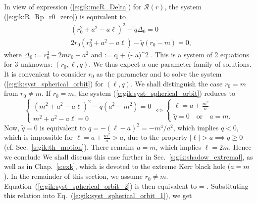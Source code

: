 In view of expression (\ref{e:gik:mcR_Delta}) for $\mathcal{R}(r)$, the system
(\ref{e:gik:R_Rp_r0_zero}) is equivalent to
\begin{subequations}
\label{e:gik:syst_spherical_orbit}
\begin{align}
    &(r_0^2 + a^2 - a \ell)^2 - \tilde{q} \Delta_0 = 0  \label{e:gik:syst_spherical_orbit_1} \\
    & 2 r_0 (r_0^2 + a^2 - a \ell) - \tilde{q} (r_0 - m) = 0 , \label{e:gik:syst_spherical_orbit_2}
\end{align}
\end{subequations}
where $\Delta_0 := r_0^2 - 2 m r_0 + a^2$ and
\be \label{e:gik:def_tq}
     := q + (\ell - a)^2 .
\ee
This is a system of 2 equations for 3 unknowns: $(r_0,\ell,q)$. We thus
expect a one-parameter family of solutions. It is convenient to consider
$r_0$ as the parameter and to solve the system (\ref{e:gik:syst_spherical_orbit})
for $(\ell,q)$.
We shall distinguish the case $r_0 = m$ from $r_0 \neq m$.
If $r_0 = m$, the system (\ref{e:gik:syst_spherical_orbit}) reduces to
\[
\left\{\begin{array}{l}
    (m^2 + a^2 - a \ell)^2 - \tilde{q} (a^2 - m^2) = 0 \\
    m^2 + a^2 - a \ell = 0
\end{array}
\right.
\iff
\left\{\begin{array}{l}
    \ell = a + \frac{m^2}{a}\\
    \tilde{q} = 0 \quad\mbox{or}\quad a = m .
\end{array}
\right.
\]
Now, $\tilde{q} = 0$ is equivalent to $q = - (\ell - a)^2 = - m^4 / a^2$,
which implies $q< 0$, which is impossible for $\ell = a + \frac{m^2}{a} > a$,
due to the property $|\ell| > a \implies q \geq 0$ (cf. Sec.~\ref{s:gik:th_motion}).
There remains $a = m$, which implies $\ell = 2 m$. Hence we conclude
\be \label{e:gik:spher_orb_r0_eq_m}
\ee
We shall discuss this case further in Sec.~\ref{s:gik:shadow_extremal}, as well as in
Chap.~\ref{s:exk}, which is devoted
to the extreme Kerr black hole ($a=m$).
In the remainder of this section, we assume $r_0 \neq m$.
Equation~(\ref{e:gik:syst_spherical_orbit_2}) is then equivalent to
\be \label{e:gik:spher_tq_sol}
     =  .
\ee
Substituting this relation into Eq.~(\ref{e:gik:syst_spherical_orbit_1}), we get
